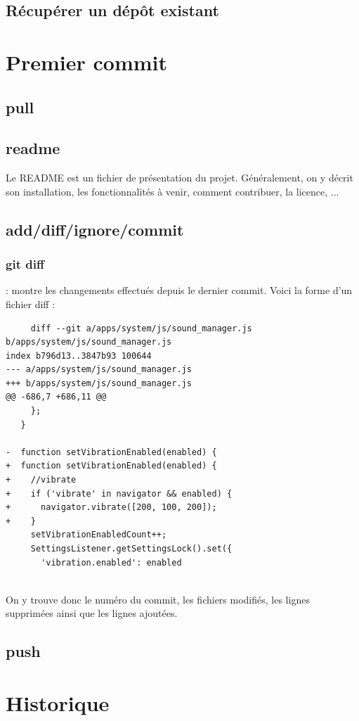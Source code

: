 \documentclass[a4paper,10pt]{report}
\begin{document}
\subsection{R\'ecup\'erer un d\'ep\^ot existant}
  \section{Premier commit}
     \subsection{pull}
     \subsection{readme}
     Le README est un fichier de présentation du projet. Généralement, on y décrit son installation, les fonctionnalités à venir, comment contribuer, la licence, ...
     \subsection{add/diff/ignore/commit}
\subsubsection{git diff} : montre les changements effectués depuis le dernier commit. Voici la forme d'un fichier diff :
\begin{verbatim}
     diff --git a/apps/system/js/sound_manager.js b/apps/system/js/sound_manager.js
index b796d13..3847b93 100644
--- a/apps/system/js/sound_manager.js
+++ b/apps/system/js/sound_manager.js
@@ -686,7 +686,11 @@
     };
   }
 
-  function setVibrationEnabled(enabled) {
+  function setVibrationEnabled(enabled) {    
+    //vibrate
+    if ('vibrate' in navigator && enabled) {
+      navigator.vibrate([200, 100, 200]);
+    }
     setVibrationEnabledCount++;
     SettingsListener.getSettingsLock().set({
       'vibration.enabled': enabled
    
\end{verbatim}   
     On y trouve donc le numéro du commit, les fichiers modifiés, les lignes supprimées ainsi que les lignes ajoutées.
     \subsection{push}
  \section{Historique}
\end{document}
